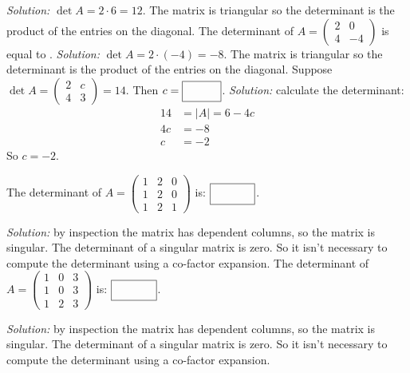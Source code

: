 \begin{parts}
        \ifnum {} {\color{DarkBlue} \textit{Solution:}  $\det A = 2\cdot 6 = 12$. The matrix is triangular so the determinant is the product of the entries on the diagonal. } \fi    
    \fi 
    \ifnum {}
        The determinant of $A = \begin{pmatrix} 2&0\\4&-4\end{pmatrix}$ is equal to \framebox{\strut\hspace{1cm}}.
        \ifnum {} {\color{DarkBlue} \textit{Solution:} $\det A = 2\cdot (-4) = -8$. The matrix is triangular so the determinant is the product of the entries on the diagonal.  } \fi    
    \fi 
    \ifnum {}
        Suppose $\det A = \begin{pmatrix} 2& c\\4&3\end{pmatrix}=14$. 
        Then $c = \framebox{\strut\hspace{1cm}}$. 
        \ifnum {} {\color{DarkBlue} \textit{Solution:}  calculate the determinant: \begin{align}
            14 &= |A| = 6 -4c \\ 4c &= -8 \\ c &= -2
        \end{align}So $c = -2$. } \fi    
    \fi 
    
    \ifnum {}
        The determinant of $A = \begin{pmatrix}  1&2&0\\1&2&0\\1&2&1\end{pmatrix}$ is: $\framebox{\strut\hspace{1.2cm}}$.
        
        \ifnum {} {\color{DarkBlue} \textit{Solution:} by inspection the matrix has dependent columns, so the matrix is singular. The determinant of a singular matrix is zero. So it isn't necessary to compute the determinant using a co-factor expansion.}
          \fi
    \fi    
    \ifnum {}
        The determinant of $A = \begin{pmatrix}  1&0&3\\1&0&3\\1&2&3\end{pmatrix}$ is: $\framebox{\strut\hspace{1.2cm}}$.
        
        \ifnum {} {\color{DarkBlue} \textit{Solution:} by inspection the matrix has dependent columns, so the matrix is singular. The determinant of a singular matrix is zero. So it isn't necessary to compute the determinant using a co-factor expansion.}
        \fi
    \fi      


\end{parts}
